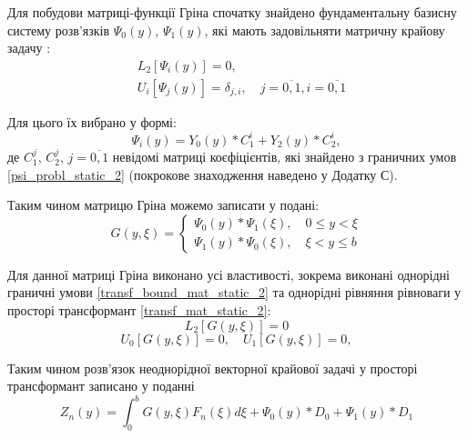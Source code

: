 Для побудови матриці-функції Гріна спочатку знайдено фундаментальну базисну систему розв'язків $\Psi_0(y)$, $\Psi_1(y)$, які мають задовільняти матричну крайову задачу \cite{popov_2}:
\begin{align}\label{psi_probl_static_2}
    &L_2\left[ \Psi_i(y) \right] = 0, \nonumber \\
    &U_i\left[ \Psi_j(y) \right] = \delta_{j,i}, \quad j= \overline{0, 1}, i= \overline{0, 1}
\end{align}

Для цього їх вибрано у формі:
\begin{equation}\label{psi_static_2}
    \Psi_i(y) = Y_0(y) * C_1^i + Y_2(y) * C_2^i,
\end{equation}
де $C_1^j$, $C_2^j$, $j=\overline{0, 1}$ невідомі матриці коєфіцієнтів, які знайдено з граничних умов \eqref{psi_probl_static_2}
(покрокове знаходження наведено у Додатку С).

Таким чином матрицю Гріна можемо записати у подані:
\begin{equation}\label{grin_matrix_static_2}
    G(y,\xi) = 
    \begin{cases}
        \Psi_0(y) * \Psi_1(\xi), \quad 0 \le y < \xi \\
        \Psi_1(y) * \Psi_0(\xi), \quad \xi < y \le b
    \end{cases}
\end{equation}

Для данної матриці Гріна виконано усі властивості, зокрема виконані однорідні граничні умови \eqref{transf_bound_mat_static_2}
та однорідні рівняння рівноваги у просторі трансформант \eqref{transf_mat_static_2}:
\begin{equation*}
    L_2\left[  G(y, \xi) \right] = 0
\end{equation*}
\begin{equation*}
    U_0\left[ G(y, \xi) \right] = 0, \quad  U_1\left[ G(y, \xi) \right] = 0,
\end{equation*}

Таким чином розв'язок неоднорідної векторної крайової задачі у просторі трансформант записано у поданні \cite{popov_2}
\begin{equation}
    Z_n(y) = \int_0^b G(y,\xi) F_n(\xi) d\xi + \Psi_0(y) * D_0 + \Psi_1(y) * D_1
\end{equation}

